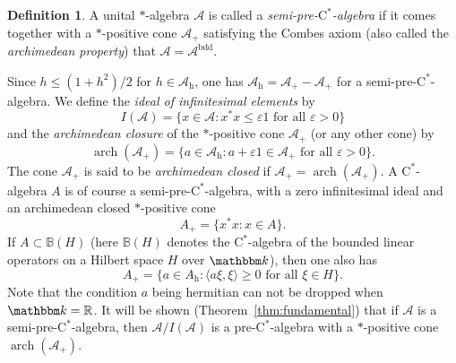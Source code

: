 \documentclass[12pt]{amsart}
\theoremstyle{definition}
\newtheorem*{defn}{Definition}
\begin{document}
\begin{defn}
A unital $*$-algebra ${{\mathcal A}}$ is called a \emph{semi-pre-$\mathrm{C}^*$-algebra}
if it comes together with a $*$-positive cone ${{\mathcal A}}_+$ satisfying
the Combes axiom (also called the \emph{archimedean property}) that ${{\mathcal A}}={{\mathcal A}}^{\mathrm{bdd}}$.
\end{defn}

Since $h\le (1+h^2)/2$ for $h\in{{\mathcal A}}_{\mathrm{h}}$, one has ${{\mathcal A}}_{\mathrm{h}}={{\mathcal A}}_+-{{\mathcal A}}_+$ for
a {semi-pre-$\mathrm{C}^*$-alge\-bra\xspace}.
We define the \emph{ideal of infinitesimal elements} by
\[
I({{\mathcal A}})=\{ x\in{{\mathcal A}} : x^*x\le{\varepsilon}1\mbox{ for all }{\varepsilon}>0\}
\]
and the \emph{archimedean closure} of the $*$-positive cone ${{\mathcal A}}_+$ (or any other cone) by
\[
\operatorname*{arch}({{\mathcal A}}_+)=\{ a\in{{\mathcal A}}_{\mathrm{h}} : a+{\varepsilon}1\in{{\mathcal A}}_+\mbox{ for all }{\varepsilon}>0\}.
\]
The cone ${{\mathcal A}}_+$ is said to be \emph{archimedean closed} if ${{\mathcal A}}_+=\operatorname*{arch}({{\mathcal A}}_+)$.
A {$\mathrm{C}^*$-alge\-bra\xspace} $A$ is of course a {semi-pre-$\mathrm{C}^*$-alge\-bra\xspace},
with a zero infinitesimal ideal and an archimedean closed $*$-positive cone
\[
A_+=\{ x^*x : x\in A\}.
\]
If $A\subset{{\mathbb B}}({H})$ (here ${{\mathbb B}}({H})$ denotes the {$\mathrm{C}^*$-alge\-bra\xspace}
of the bounded linear operators on a Hilbert space ${H}$ over ${{\mathbbm k}}$),
then one also has
\[
A_+=\{ a\in A_{\mathrm{h}} : {\mathopen{\langle}{a\xi,\xi}\mathclose{\rangle}}\geq0\mbox{ for all }\xi\in{H}\}.
\]
Note that the condition $a$ being hermitian can not be dropped when ${{\mathbbm k}}={{\mathbb R}}$.
It will be shown (Theorem~\ref{thm:fundamental}) that if ${{\mathcal A}}$ is a {semi-pre-$\mathrm{C}^*$-alge\-bra\xspace},
then ${{\mathcal A}}/I({{\mathcal A}})$ is a pre-{$\mathrm{C}^*$-alge\-bra\xspace} with a $*$-positive
cone $\operatorname*{arch}({{\mathcal A}}_+)$.
\end{document}
